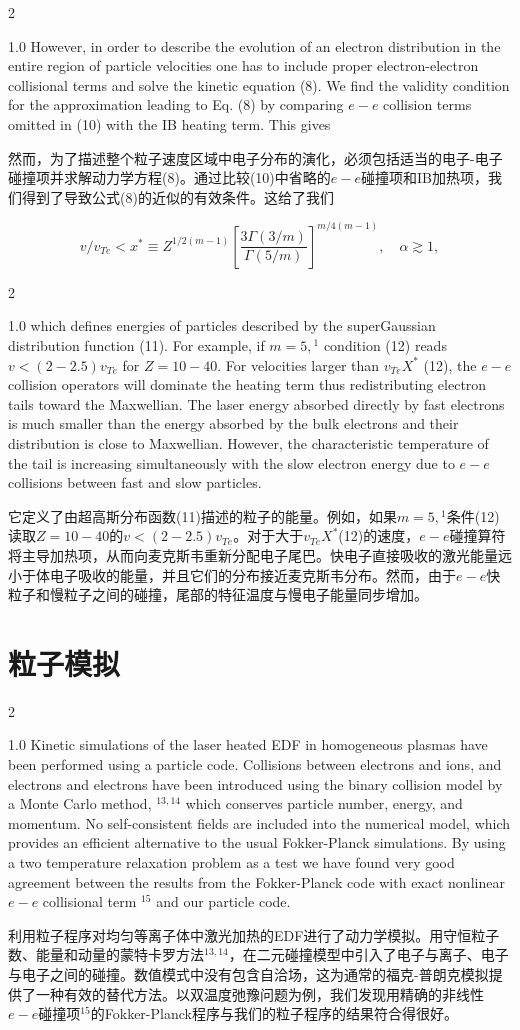 \documentclass[oneside,onecolumn]{article}
\newcommand\enzhbox[2]{
	\quad\par \begin{paracol}{2} 
			\begin{spacing}{1.0}
					\footnotesize  #1
			\end{spacing}
			
		\switchcolumn[1] 
		#2
	\end{paracol} 
}
\begin{document}
\begin{sloppypar}
\enzhbox{  However, in order to describe the evolution of an electron distribution in the entire region of particle velocities one has to include proper electron-electron collisional terms and solve the kinetic equation (8). We find the validity condition for the approximation leading to Eq. (8) by comparing $e-e$ collision terms omitted in (10) with the IB heating term. This gives
}{
然而，为了描述整个粒子速度区域中电子分布的演化，必须包括适当的电子-电子碰撞项并求解动力学方程(8)。通过比较(10)中省略的$e-e$碰撞项和IB加热项，我们得到了导致公式(8)的近似的有效条件。这给了我们
}
  
  \begin{equation}
  v / v_{T e}<x^{*} \equiv Z^{1 / 2(m-1)}\left[\frac{3 \Gamma(3 / m)}{\Gamma(5 / m)}\right]^{m / 4(m-1)}, \quad \alpha \gtrsim 1,
  \end{equation}
  

\enzhbox{  which defines energies of particles described by the superGaussian distribution function (11). For example, if $m=5,{ }^{1}$ condition (12) reads $v<(2-2.5) v_{T e}$ for $Z=10-40$. For velocities larger than $v_{T e} X^{*}$ (12), the $e-e$ collision operators will dominate the heating term thus redistributing electron tails toward the Maxwellian. The laser energy absorbed directly by fast electrons is much smaller than the energy absorbed by the bulk electrons and their distribution is close to Maxwellian. However, the characteristic temperature of the tail is increasing simultaneously with the slow electron energy due to $e-e$ collisions between fast and slow particles.
}{
它定义了由超高斯分布函数(11)描述的粒子的能量。例如，如果$m=5,{ }^{1}$条件(12)读取$Z=10-40$的$v<(2-2.5) v_{T e}$。对于大于$v_{T e} X^{*}$(12)的速度，$e-e$碰撞算符将主导加热项，从而向麦克斯韦重新分配电子尾巴。快电子直接吸收的激光能量远小于体电子吸收的能量，并且它们的分布接近麦克斯韦分布。然而，由于$e-e$快粒子和慢粒子之间的碰撞，尾部的特征温度与慢电子能量同步增加。
}
  
  \section{粒子模拟}

\enzhbox{  Kinetic simulations of the laser heated EDF in homogeneous plasmas have been performed using a particle code. Collisions between electrons and ions, and electrons and electrons have been introduced using the binary collision model by a Monte Carlo method, ${ }^{13,14}$ which conserves particle number, energy, and momentum. No self-consistent fields are included into the numerical model, which provides an efficient alternative to the usual Fokker-Planck simulations. By using a two temperature relaxation problem as a test we have found very good agreement between the results from the Fokker-Planck code with exact nonlinear $e-e$ collisional term ${ }^{15}$ and our particle code.
}{
利用粒子程序对均匀等离子体中激光加热的EDF进行了动力学模拟。用守恒粒子数、能量和动量的蒙特卡罗方法${ }^{13,14}$，在二元碰撞模型中引入了电子与离子、电子与电子之间的碰撞。数值模式中没有包含自洽场，这为通常的福克-普朗克模拟提供了一种有效的替代方法。以双温度弛豫问题为例，我们发现用精确的非线性$e-e$碰撞项${ }^{15}$的Fokker-Planck程序与我们的粒子程序的结果符合得很好。
}
  


\end{sloppypar}
\end{document}
